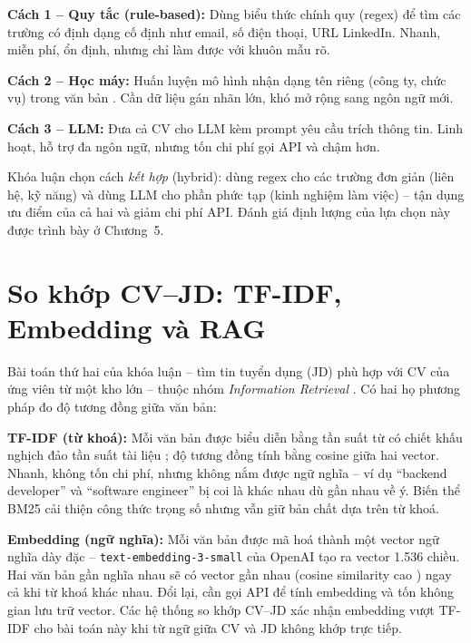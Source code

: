 \documentclass[../DoAn.tex]{subfiles}
\begin{document}
\textbf{Cách 1 -- Quy tắc (rule-based):} Dùng biểu thức chính quy (regex) để tìm các trường có định dạng cố định như email, số điện thoại, URL LinkedIn. Nhanh, miễn phí, ổn định, nhưng chỉ làm được với khuôn mẫu rõ.

\textbf{Cách 2 -- Học máy:} Huấn luyện mô hình nhận dạng tên riêng (công ty, chức vụ) trong văn bản \cite{chen2016resume,jiechieu2021skills}. Cần dữ liệu gán nhãn lớn, khó mở rộng sang ngôn ngữ mới.

\textbf{Cách 3 -- LLM:} Đưa cả CV cho LLM kèm prompt yêu cầu trích thông tin. Linh hoạt, hỗ trợ đa ngôn ngữ, nhưng tốn chi phí gọi API và chậm hơn.

Khóa luận chọn cách \textit{kết hợp} (hybrid): dùng regex cho các trường đơn giản (liên hệ, kỹ năng) và dùng LLM cho phần phức tạp (kinh nghiệm làm việc) -- tận dụng ưu điểm của cả hai và giảm chi phí API. Đánh giá định lượng của lựa chọn này được trình bày ở Chương~5.

\section{So khớp CV--JD: TF-IDF, Embedding và RAG}

Bài toán thứ hai của khóa luận -- tìm tin tuyển dụng (JD) phù hợp với CV của ứng viên từ một kho lớn -- thuộc nhóm \textit{Information Retrieval} \cite{manning2008ir}. Có hai họ phương pháp đo độ tương đồng giữa văn bản:

\textbf{TF-IDF (từ khoá):} Mỗi văn bản được biểu diễn bằng tần suất từ có chiết khấu nghịch đảo tần suất tài liệu \cite{sparck1972statistical}; độ tương đồng tính bằng cosine giữa hai vector. Nhanh, không tốn chi phí, nhưng không nắm được ngữ nghĩa -- ví dụ ``backend developer'' và ``software engineer'' bị coi là khác nhau dù gần nhau về ý. Biến thể BM25 \cite{robertson2009bm25} cải thiện công thức trọng số nhưng vẫn giữ bản chất dựa trên từ khoá.

\textbf{Embedding (ngữ nghĩa):} Mỗi văn bản được mã hoá thành một vector ngữ nghĩa dày đặc \cite{karpukhin2020dense} -- \texttt{text-embedding-3-small} của OpenAI \cite{openai2024embedding} tạo ra vector 1.536 chiều. Hai văn bản gần nghĩa nhau sẽ có vector gần nhau (cosine similarity cao \cite{turney2010frequency}) ngay cả khi từ khoá khác nhau. Đổi lại, cần gọi API để tính embedding và tốn không gian lưu trữ vector. Các hệ thống so khớp CV--JD \cite{qin2018enhancing,shen2018joint,he2021towards} xác nhận embedding vượt TF-IDF cho bài toán này khi từ ngữ giữa CV và JD không khớp trực tiếp.
\end{document}
